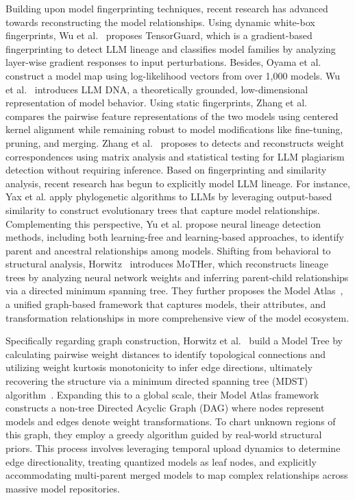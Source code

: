 Building upon model fingerprinting techniques, recent research has advanced towards reconstructing the model relationships. Using dynamic white-box fingerprints, Wu et al.~\cite{wu2025tensorguard} proposes TensorGuard, which is a gradient-based fingerprinting to detect LLM lineage and classifies model families by analyzing layer-wise gradient responses to input perturbations. Besides, Oyama et al.~\cite{oyama2025mapping} construct a model map using log-likelihood vectors from over 1,000 models. Wu et al.~\cite{wu2025llm} introduces LLM DNA, a theoretically grounded, low-dimensional representation of model behavior. Using static fingerprints, Zhang et al.~\cite{zhang2024reef} compares the pairwise feature representations of the two models using centered kernel alignment while remaining robust to model modifications like fine-tuning, pruning, and merging. Zhang et al.~\cite{zhang2025matrix} proposes to detects and reconstructs weight correspondences using matrix analysis and statistical testing for LLM plagiarism detection without requiring inference. Based on fingerprinting and similarity analysis, recent research has begun to explicitly model LLM lineage. For instance, Yax et al.\cite{yax2024phylolm} apply phylogenetic algorithms to LLMs by leveraging output-based similarity to construct evolutionary trees that capture model relationships. Complementing this perspective, Yu et al.\cite{yu2024neural} propose neural lineage detection methods, including both learning-free and learning-based approaches, to identify parent and ancestral relationships among models. Shifting from behavioral to structural analysis, Horwitz~\cite{horwitz2024unsupervised} introduces MoTHer, which reconstructs lineage trees by analyzing neural network weights and inferring parent-child relationships via a directed minimum spanning tree. They further proposes the Model Atlas~\cite{horwitz2025we}, a unified graph-based framework that captures models, their attributes, and transformation relationships in more comprehensive view of the model ecosystem. 

Specifically regarding graph construction, Horwitz et al.~\cite{horwitz2024unsupervised} build a Model Tree by calculating pairwise weight distances to identify topological connections and utilizing weight kurtosis monotonicity to infer edge directions, ultimately recovering the structure via a minimum directed spanning tree (MDST) algorithm~\cite{chu1965shortest,edmonds1967optimum}. Expanding this to a global scale, their Model Atlas framework~\cite{horwitz2025we} constructs a non-tree Directed Acyclic Graph (DAG) where nodes represent models and edges denote weight transformations. To chart unknown regions of this graph, they employ a greedy algorithm guided by real-world structural priors. This process involves leveraging temporal upload dynamics to determine edge directionality, treating quantized models as leaf nodes, and explicitly accommodating multi-parent merged models to map complex relationships across massive model repositories.

